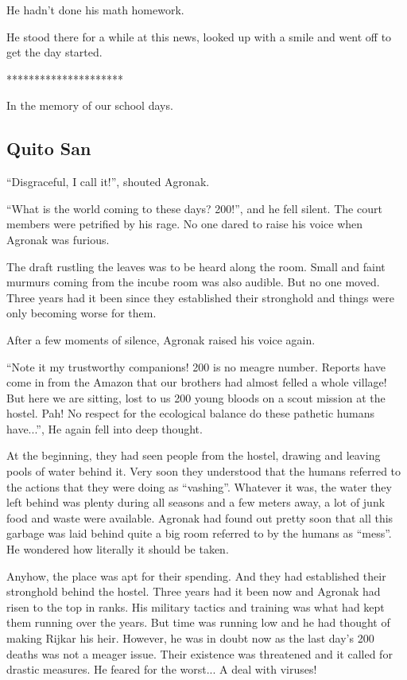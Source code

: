 \documentclass[twoside,11pt,titlepage]{article}
\begin{document}
He hadn't done his math homework.

He stood there for a while at this news, looked up with a smile and went off to get the day started.

\bigskip
\begin{center}
*********************
\end{center}

In the memory of our school days.

\newpage

\begin{center}
  \section{Quito San}
\end{center}
\bigskip
\bigskip
\bigskip

``Disgraceful, I call it!'', shouted Agronak.

``What is the world coming to these days? 200!'', and he fell silent. The court members were petrified by his rage. No one dared to raise his voice when Agronak was furious.

The draft rustling the leaves was to be heard along the room. Small and faint murmurs coming from the incube room was also audible. But no one moved. Three years had it been since they established their stronghold and things were only becoming worse for them.

After a few moments of silence, Agronak raised his voice again.

``Note it my trustworthy companions! 200 is no meagre number. Reports have come in from the Amazon that our brothers had almost felled a whole village! But here we are sitting, lost to us 200 young bloods on a scout mission at the hostel. Pah! No respect for the ecological balance do these pathetic humans have...'', He again fell into deep thought.

At the beginning, they had seen people from the hostel, drawing and leaving pools of water behind it. Very soon they understood that the humans referred to the actions that they were doing as ``vashing''. Whatever it was, the water they left behind was plenty during all seasons and a few meters away, a lot of junk food and waste were available. Agronak had found out pretty soon that all this garbage was laid behind quite a big room referred to by the humans as ``mess''. He wondered how literally it should be taken.

Anyhow, the place was apt for their spending. And they had established their stronghold behind the hostel. Three years had it been now and Agronak had risen to the top in ranks. His military tactics and training was what had kept them running over the years. But time was running low and he had thought of making Rijkar his heir. However, he was in doubt now as the last day's 200 deaths was not a meager issue. Their existence was threatened and it called for drastic measures. He feared for the worst... A deal with viruses!
\end{document}
